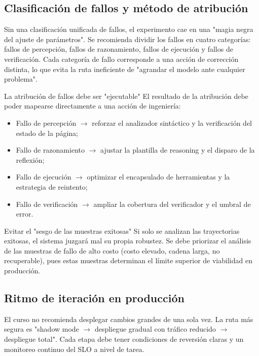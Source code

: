 \documentclass[a4paper]{article}
\begin{document}
\subsection{Clasificación de fallos y método de atribución}
Sin una clasificación unificada de fallos, el experimento cae en una "magia negra del ajuste de parámetros". Se recomienda dividir los fallos en cuatro categorías: fallos de percepción, fallos de razonamiento, fallos de ejecución y fallos de verificación. Cada categoría de fallo corresponde a una acción de corrección distinta, lo que evita la ruta ineficiente de "agrandar el modelo ante cualquier problema".

\begin{importantbox}{La atribución de fallos debe ser "ejecutable"}
El resultado de la atribución debe poder mapearse directamente a una acción de ingeniería:
\begin{itemize}
    \item Fallo de percepción $\rightarrow$ reforzar el analizador sintáctico y la verificación del estado de la página;
    \item Fallo de razonamiento $\rightarrow$ ajustar la plantilla de reasoning y el disparo de la reflexión;
    \item Fallo de ejecución $\rightarrow$ optimizar el encapsulado de herramientas y la estrategia de reintento;
    \item Fallo de verificación $\rightarrow$ ampliar la cobertura del verificador y el umbral de error.
\end{itemize}
\end{importantbox}

\begin{warningbox}{Evitar el "sesgo de las muestras exitosas"}
Si solo se analizan las trayectorias exitosas, el sistema juzgará mal su propia robustez. Se debe priorizar el análisis de las muestras de fallo de alto costo (costo elevado, cadena larga, no recuperable), pues estas muestras determinan el límite superior de viabilidad en producción.
\end{warningbox}

\subsection{Ritmo de iteración en producción}
El curso no recomienda desplegar cambios grandes de una sola vez. La ruta más segura es "shadow mode $\rightarrow$ despliegue gradual con tráfico reducido $\rightarrow$ despliegue total". Cada etapa debe tener condiciones de reversión claras y un monitoreo continuo del SLO a nivel de tarea.
\end{document}
